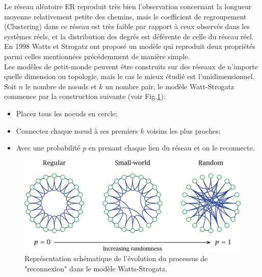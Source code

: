  
 Le réseau aléatoire ER reproduit très bien l'observation concernant la longueur moyenne relativement petite des chemins, mais le coefficient de regroupement (Clustering) dans ce réseau est très faible par rapport à ceux observés dans les systèmes réels, et la distribution des degrés est déférente de celle du réseau réel. En 1998 Watts et Strogatz \cite{Watss-Strogatz1998} ont proposé un modèle qui reproduit deux propriétés parmi celles mentionnées précédemment de manière simple.\\
 Les modèles de petit-monde peuvent être construits sur des réseaux de n'importe quelle dimension ou topologie, mais le cas le mieux étudié est l'unidimensionnel. Soit $n$ le nombre de nœuds et $k$ un nombre pair, le modèle Watt-Strogatz commence par la construction suivante (voir Fig.\ref{SW1}): 
 \begin{itemize}
 	\item Placez tous les noeuds en cercle;
 	\item Connectez chaque nœud à ses premiers $k$ voisins les plus proches;
 	\item  Avec une probabilité $p$ en prenant chaque lien du réseau et on le reconnecte.
 \end{itemize}
 \begin{figure}[h!]
 	\centering
 	\includegraphics[scale=0.6]{./figures/SW1}
 	\caption{Représentation schématique de l'évolution du processus de "reconnexion" dans le modèle Watts-Strogatz.}  	
 	\label{SW1}
 \end{figure}
 
